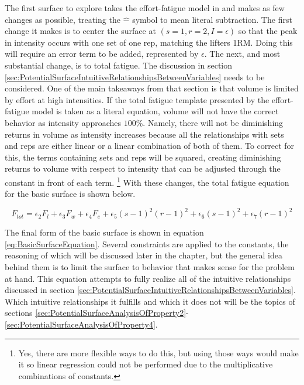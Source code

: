 The first surface to explore takes the effort-fatigue model in and makes as few changes as possible, treating the $\hat{-}$ symbol to mean literal subtraction. The first change it makes is to center the surface at $(s=1,r=2,I=\epsilon)$ so that the peak in intensity occurs with one set of one rep, matching the lifters 1RM. Doing this will require an error term to be added, represented by $\epsilon$. The next, and most substantial change, is to total fatigue. The discussion in section \ref{sec:PotentialSurfaceIntuitiveRelationshipsBetweenVariables} needs to be considered. One of the main takeaways from that section is that volume is limited by effort at high intensities. If the total fatigue template presented by the effort-fatigue model is taken as a literal equation, volume will not have the correct behavior as intensity approaches $100$\%. Namely, there will not be diminishing returns in volume as intensity increases because all the relationships with sets and reps are either linear or a linear combination of both of them. To correct for this, the terms containing sets and reps will be squared, creating diminishing returns to volume with respect to intensity that can be adjusted through the constant in front of each term. \footnote{Yes, there are more flexible ways to do this, but using those ways would make it so linear regression could not be performed due to the multiplicative combinations of constants.} With these changes, the total fatigue equation for the basic surface is shown below. 

\begin{equation*}
	F_{tot} = \epsilon_2 F_l+\epsilon_3 F_w+\epsilon_4 F_e+\epsilon_5 (s-1)^2(r-1)^2+\epsilon_6 (s-1)^2+\epsilon_7 (r-1)^2
\end{equation*}

The final form of the basic surface is shown in equation \ref{eq:BasicSurfaceEquation}. Several constraints are applied to the constants, the reasoning of which will be discussed later in the chapter, but the general idea behind them is to limit the surface to behavior that makes sense for the problem at hand. This equation attempts to fully realize all of the intuitive relationships discussed in section \ref{sec:PotentialSurfaceIntuitiveRelationshipsBetweenVariables}. Which intuitive relationships it fulfills and which it does not will be the topics of sections \ref{sec:PotentialSurfaceAnalysisOfProperty2}-\ref{sec:PotentialSurfaceAnalysisOfProperty4}.

